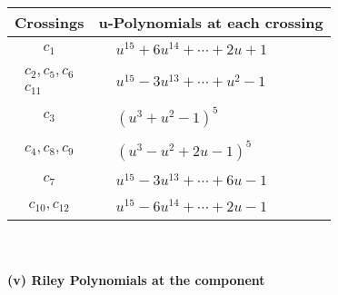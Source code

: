 \documentclass[1p]{elsarticle_modified}
\theoremstyle{definition}
\begin{document}
\begin{tabular}{m{50pt}|m{274pt}}
Crossings & \hspace{64pt}u-Polynomials at each crossing \\
\hline $$\begin{aligned}c_{1}\end{aligned}$$&$\begin{aligned}
&u^{15}+6 u^{14}+\cdots+2 u+1
\end{aligned}$\\
\hline $$\begin{aligned}c_{2},c_{5},c_{6}\\c_{11}\end{aligned}$$&$\begin{aligned}
&u^{15}-3 u^{13}+\cdots+u^2-1
\end{aligned}$\\
\hline $$\begin{aligned}c_{3}\end{aligned}$$&$\begin{aligned}
&(u^3+u^2-1)^5
\end{aligned}$\\
\hline $$\begin{aligned}c_{4},c_{8},c_{9}\end{aligned}$$&$\begin{aligned}
&(u^3- u^2+2 u-1)^5
\end{aligned}$\\
\hline $$\begin{aligned}c_{7}\end{aligned}$$&$\begin{aligned}
&u^{15}-3 u^{13}+\cdots+6 u-1
\end{aligned}$\\
\hline $$\begin{aligned}c_{10},c_{12}\end{aligned}$$&$\begin{aligned}
&u^{15}-6 u^{14}+\cdots+2 u-1
\end{aligned}$\\
\hline
\end{tabular}\\~\\
\newpage\renewcommand{\arraystretch}{1}
\flushleft \textbf{(v) Riley Polynomials at the component}\newline \\
\end{document}
